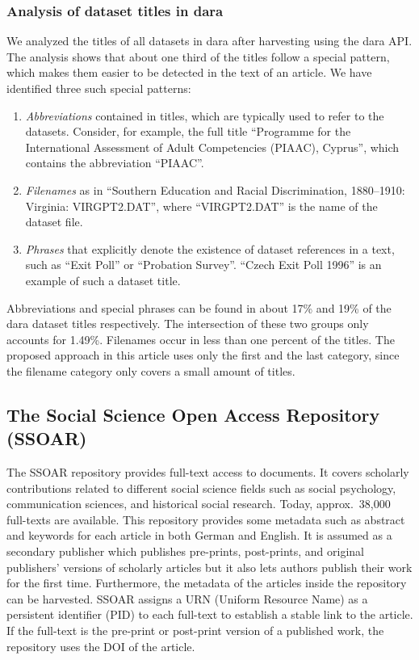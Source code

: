 \documentclass{IOS-Book-Article}
\newcommand{\dara}{\textsf{da\textbar ra}}
\begin{document}
\subsubsection{Analysis of dataset titles in {\dara}}
We analyzed the titles of all datasets in {\dara} after harvesting using the {\dara} API.
The analysis shows that about one third of the titles follow a special pattern, which makes them easier to be detected in the text of an article.
We have identified three such special patterns:
\begin{enumerate}
	\item \emph{Abbreviations} contained in titles, which are typically used to refer to the datasets. 
		Consider, for example, the full title \enquote{Programme for the International Assessment of Adult Competencies (PIAAC), Cyprus}, which contains the abbreviation \enquote{PIAAC}.
	\item \emph{Filenames} as in \enquote{Southern Education and Racial Discrimination, 1880--1910: Virginia: VIRGPT2.DAT}, where \enquote{VIRGPT2.DAT} is the name of the dataset file.
	\item \emph{Phrases} that explicitly denote the existence of dataset references in a text, such as \enquote{Exit Poll} or \enquote{Probation Survey}.
\enquote{Czech Exit Poll 1996} is an example of such a dataset title. 
\end{enumerate}

Abbreviations and special phrases can be found in about 17\% and 19\% of the {\dara} dataset titles respectively.
The intersection of these two groups only accounts for 1.49\%.
Filenames occur in less than one percent of the titles. 
The proposed approach in this article uses only the first and the last category, since the filename category only covers a small amount of titles.

\subsection{The Social Science Open Access Repository (SSOAR)}
The SSOAR repository provides full-text access to documents.
It covers scholarly contributions related to different social science fields such as social psychology, communication sciences, and historical social research.
Today, approx.\ 38,000 full-texts are available.
This repository provides some metadata such as abstract and keywords for each article in both German and English.
It is assumed as a secondary publisher which publishes pre-prints, post-prints, and original publishers' versions of scholarly articles but it also lets authors publish their work for the first time.
Furthermore, the metadata of the articles inside the repository can be harvested.
SSOAR assigns a URN (Uniform Resource Name) as a persistent identifier (PID) to each full-text to establish a stable link to the article.
If the full-text is the pre-print or post-print version of a published work, the repository uses the DOI of the article.  
\end{document}
